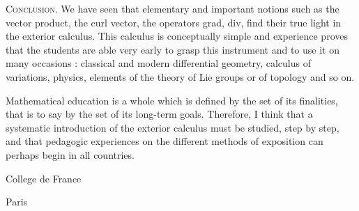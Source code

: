 \begin{enumerate}
\textsc{Conclusion.} We have seen that elementary and important
notions such as the vector product, the curl vector, the operators
grad, div, find their true light in the exterior calculus. This
calculus is conceptually simple and experience proves that the
students are able very early to grasp this instrument and to use it on
many occasions : classical and modern differential geometry, calculus
of variations, physics, elements of the theory of Lie groups or of
topology and so on.

Mathematical education is a whole which is defined by the set of its
finalities, that is to say by the set of its long-term
goals. Therefore, I think that a systematic introduction of the
exterior calculus must be studied, step by step, and that pedagogic
experiences on the different methods of exposition can perhaps begin
in all countries.
\end{enumerate}


\bigskip
\bigskip

{\fontsize{9pt}{11pt}\selectfont
College de France 

Paris }\relax
